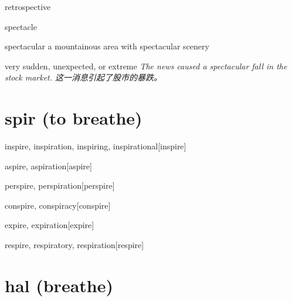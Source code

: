 \begin{RefWord}{retrospective}
\end{RefWord}

\begin{RefWord}{spectacle}
\end{RefWord}

\begin{RefWord}{spectacular}
    a mountainous area with spectacular scenery

    very sudden, unexpected, or extreme
    \textit{The news caused a spectacular fall in the stock market. 这一消息引起了股市的暴跌。 }
\end{RefWord}


















\section{spir (to breathe)}





\begin{RefWord}{inspire, inspiration, inspiring, inspirational}[inspire]
\end{RefWord}

\begin{RefWord}{aspire, aspiration}[aspire]
\end{RefWord}

\begin{RefWord}{perspire, perspiration}[perspire]
\end{RefWord}

\begin{RefWord}{conspire, conspiracy}[conspire]
\end{RefWord}

\begin{RefWord}{expire, expiration}[expire]
\end{RefWord}

\begin{RefWord}{respire, respiratory, respiration}[respire]
\end{RefWord}


\section{hal (breathe)}

